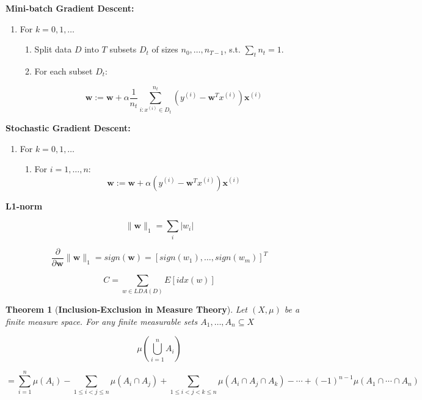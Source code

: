 \documentclass[12pt a]{article}
\newtheorem{theorem}{Theorem}
\theoremstyle{definition}
\theoremstyle{definition}
\theoremstyle{definition}
\begin{document}
{\textbf{Mini-batch Gradient Descent:}  

\begin{enumerate}
	\item For $k=0,1,\dots$ 
	\begin{enumerate}
		\item Split data $D$ into $T$ subsets $D_{t}$ of sizes $n_{0},\dots,n_{T-1}$, s.t. $\sum_{t}n_{t}=1$. 
		\item For each subset $D_{t}$: 		
		
	$$\mathbf{w}:=\mathbf{w}+ \alpha 
\frac{1}{n_{t}}\sum_{i: x^{(i)} \in D_{t}}^{n_{t}}(y^{(i)}-\mathbf{w}^{T}x^{(i)})\mathbf{x}^{(i)} $$
		
	\end{enumerate}	 
\end{enumerate} 



\textbf{Stochastic Gradient Descent:}  

\begin{enumerate}
	\item For $k=0,1,\dots$ 
	\begin{enumerate}
		\item For $i=1,\dots,n$: 		
	$$\mathbf{w}:=\mathbf{w}+ \alpha 
(y^{(i)}-\mathbf{w}^{T}x^{(i)})\mathbf{x}^{(i)} $$
		
	\end{enumerate}	 
\end{enumerate} 

\newpage

\textbf{L1-norm}

$$\|\mathbf{w}\|_{1} = \sum_{i}|w_{i}| $$

$$\frac{\partial}{\partial \mathbf{w}} \|\mathbf{w}\|_{1} = sign(\mathbf{w}) = [sign(w_{1}),\dots,sign(w_{m})]^{T}$$

$$C = \sum_{w \in LDA(D)} E[idx(w)]$$

\newpage



\begin{theorem}[\textbf{Inclusion-Exclusion in Measure Theory}] 
Let $(X,\mu)$ be  a finite measure space. For any finite measurable sets $A_{1},\dots,A_{n} \subseteq X$

$$
\mu \left(\bigcup _{i=1}^{n}A_{i}\right)
$$

$$
= \sum _{i=1}^{n}\mu(A_{i})-\sum _{1\leqslant i<j\leqslant n}\mu(A_{i}\cap A_{j})+\sum _{1\leqslant i<j<k\leqslant n}\mu(A_{i}\cap A_{j}\cap A_{k})-\cdots +(-1)^{n-1}\mu(A_{1}\cap \cdots \cap A_{n})
$$


\end{theorem}}
\end{document}
